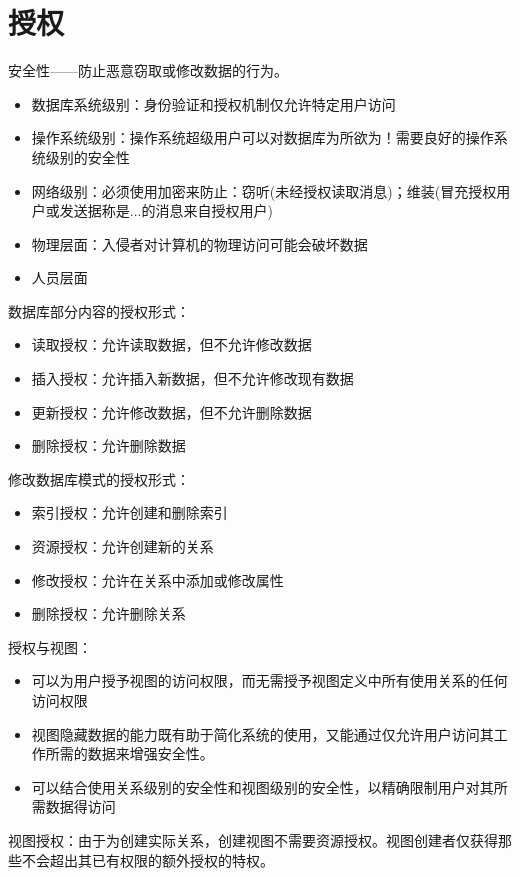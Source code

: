 \section{授权}

安全性——防止恶意窃取或修改数据的行为。
\begin{itemize}
    \item 数据库系统级别：身份验证和授权机制仅允许特定用户访问
    \item 操作系统级别：操作系统超级用户可以对数据库为所欲为！需要良好的操作系统级别的安全性
    \item 网络级别：必须使用加密来防止：窃听(未经授权读取消息)；维装(冒充授权用户或发送据称是...的消息来自授权用户)
    \item 物理层面：入侵者对计算机的物理访问可能会破坏数据
    \item 人员层面
\end{itemize}

数据库部分内容的授权形式：
\begin{itemize}
    \item 读取授权：允许读取数据，但不允许修改数据
    \item 插入授权：允许插入新数据，但不允许修改现有数据
    \item 更新授权：允许修改数据，但不允许删除数据
    \item 删除授权：允许删除数据
\end{itemize}

修改数据库模式的授权形式：
\begin{itemize}
    \item 索引授权：允许创建和删除索引
    \item 资源授权：允许创建新的关系
    \item 修改授权：允许在关系中添加或修改属性
    \item 删除授权：允许删除关系
\end{itemize}

授权与视图：
\begin{itemize}
    \item 可以为用户授予视图的访问权限，而无需授予视图定义中所有使用关系的任何访问权限
    \item 视图隐藏数据的能力既有助于简化系统的使用，又能通过仅允许用户访问其工作所需的数据来增强安全性。
    \item 可以结合使用关系级别的安全性和视图级别的安全性，以精确限制用户对其所需数据得访问
\end{itemize}

视图授权：由于为创建实际关系，创建视图不需要资源授权。视图创建者仅获得那些不会超出其已有权限的额外授权的特权。


